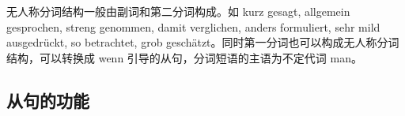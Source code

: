 无人称分词结构一般由副词和第二分词构成。如 kurz gesagt, allgemein gesprochen, streng genommen, damit verglichen, anders formuliert, sehr mild ausgedrückt, so betrachtet, grob geschätzt。同时第一分词也可以构成无人称分词结构，可以转换成 wenn 引导的从句，分词短语的主语为不定代词 man。



\subsection{从句的功能}


